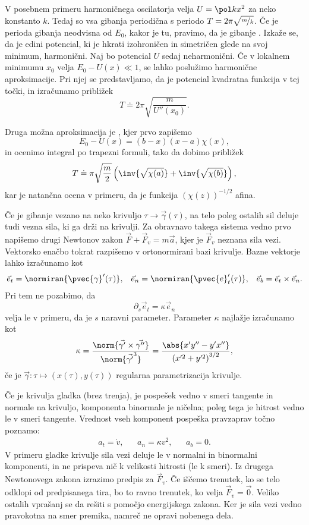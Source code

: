 V posebnem primeru harmoničnega oscilatorja velja $U = \pol k x^2$ za neko
konstanto $k$.
Tedaj so vsa gibanja periodična s periodo $T = 2 \pi \sqrt{\nicefrac{m}{k}}$.
Če je perioda gibanja neodvisna od $E_0$, kakor je tu, pravimo, da je gibanje
.
Izkaže se, da je edini potencial, ki je hkrati izohroničen in simetričen glede
na svoj minimum, harmonični.
Naj bo potencial $U$ sedaj neharmonični.
Če v lokalnem minimumu $x_0$ velja $E_0 - U(x) \ll 1$, se lahko poslužimo
harmonične aproksimacije.
Pri njej se predstavljamo, da je potencial kvadratna funkcija v tej točki, in
izračunamo približek
\[
  T \doteq 2 \pi \sqrt{\frac{m}{U''(x_0)}}.
\]

Druga možna aproksimacija je , kjer prvo zapišemo
\[
  E_0 - U(x) = (b-x)(x-a) \chi(x),
\]
in ocenimo integral po trapezni formuli, tako da dobimo približek
\[
  T \doteq \pi \sqrt{\frac{m}{2}} \left( \inv{\sqrt{\chi(a)}} +
	\inv{\sqrt{\chi(b)}} \right),
\]
kar je natančna ocena v primeru, da je funkcija ${(\chi(z))}^{-1/2}$ afina.


Če je gibanje vezano na neko krivuljo $\tau \to \vec{\gamma}(\tau)$, na telo
poleg ostalih sil deluje tudi vezna sila, ki ga drži na krivulji.
Za obravnavo takega sistema vedno prvo napišemo drugi Newtonov zakon
$\vec{F} + \vec{F}_v = m \vec{a}$, kjer je $\vec{F}_v$ neznana sila vezi.
Vektorsko enačbo tokrat razpišemo v ortonormirani bazi krivulje.
Bazne vektorje lahko izračunamo kot
\begin{align*}
  \vec{e}_t = \normiran{\pvec{\gamma}'(\tau)},
  && \vec{e}_n = \normiran{\pvec{e}'_t(\tau)},
  && \vec{e}_b = \vec{e}_t \times \vec{e}_n.
\end{align*}
Pri tem ne pozabimo, da
\[
  \partial_s \vec{e}_t = \kappa \vec{e}_n
\]
velja le v primeru, da je $s$ naravni parameter.
Parameter $\kappa$ najlažje izračunamo kot
\[
  \kappa = \frac{\norm{\vec{\gamma'} \times
	  \vec{\gamma''}}}{\norm{\vec{\gamma'}^3}}
  = \frac{\abs{x' y'' - y' x''}}{{(x'^2 + y'^2)}^{3/2}},
\]
če je $\vec{\gamma}: \tau \mapsto (x(\tau), y(\tau))$ regularna parametrizacija krivulje.

Če je krivulja gladka (brez trenja), je pospešek vedno v smeri tangente in
normale na krivuljo, komponenta binormale je ničelna; poleg tega je hitrost
vedno le v smeri tangente.
Vrednost vseh komponent pospeška pravzaprav točno poznamo:
\begin{align*}
  a_t = \dot{v}, && a_n = \kappa v^2, && a_b = 0.
\end{align*}
V primeru gladke krivulje sila vezi deluje le v normalni in binormalni
komponenti, in ne prispeva nič k velikosti hitrosti (le k smeri).
Iz drugega Newtonovega zakona izrazimo predpis za $\vec{F}_v$.
Če iščemo trenutek, ko se telo odklopi od predpisanega tira, bo to ravno
trenutek, ko velja $\vec{F}_v = \vec{0}$.
Veliko ostalih vprašanj se da rešiti s pomočjo energijskega zakona.
Ker je sila vezi vedno pravokotna na smer premika, namreč ne opravi nobenega
dela.

